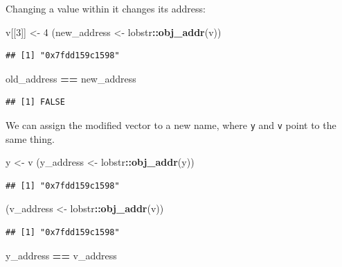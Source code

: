 \documentclass[]{book}
\newenvironment{Shaded}{\begin{snugshade}}{\end{snugshade}}
\newcommand{\DecValTok}[1]{\textcolor[rgb]{0.00,0.00,0.81}{#1}}
\newcommand{\KeywordTok}[1]{\textcolor[rgb]{0.13,0.29,0.53}{\textbf{#1}}}
\newcommand{\NormalTok}[1]{#1}
\newcommand{\OperatorTok}[1]{\textcolor[rgb]{0.81,0.36,0.00}{\textbf{#1}}}
\newcommand{\StringTok}[1]{\textcolor[rgb]{0.31,0.60,0.02}{#1}}
\begin{document}
Changing a value within it changes its address:

\begin{Shaded}
\begin{Highlighting}[]
\NormalTok{v[[}\DecValTok{3}\NormalTok{]] <-}\StringTok{ }\DecValTok{4}
\NormalTok{(new_address <-}\StringTok{ }\NormalTok{lobstr}\OperatorTok{::}\KeywordTok{obj_addr}\NormalTok{(v))}
\end{Highlighting}
\end{Shaded}

\begin{verbatim}
## [1] "0x7fdd159c1598"
\end{verbatim}

\begin{Shaded}
\begin{Highlighting}[]
\NormalTok{old_address }\OperatorTok{==}\StringTok{ }\NormalTok{new_address}
\end{Highlighting}
\end{Shaded}

\begin{verbatim}
## [1] FALSE
\end{verbatim}

We can assign the modified vector to a new name, where \texttt{y} and \texttt{v} point to the same thing.

\begin{Shaded}
\begin{Highlighting}[]
\NormalTok{y <-}\StringTok{ }\NormalTok{v}
\NormalTok{(y_address <-}\StringTok{ }\NormalTok{lobstr}\OperatorTok{::}\KeywordTok{obj_addr}\NormalTok{(y))}
\end{Highlighting}
\end{Shaded}

\begin{verbatim}
## [1] "0x7fdd159c1598"
\end{verbatim}

\begin{Shaded}
\begin{Highlighting}[]
\NormalTok{(v_address <-}\StringTok{ }\NormalTok{lobstr}\OperatorTok{::}\KeywordTok{obj_addr}\NormalTok{(v))}
\end{Highlighting}
\end{Shaded}

\begin{verbatim}
## [1] "0x7fdd159c1598"
\end{verbatim}

\begin{Shaded}
\begin{Highlighting}[]
\NormalTok{y_address }\OperatorTok{==}\StringTok{ }\NormalTok{v_address}
\end{Highlighting}
\end{Shaded}
\end{document}

